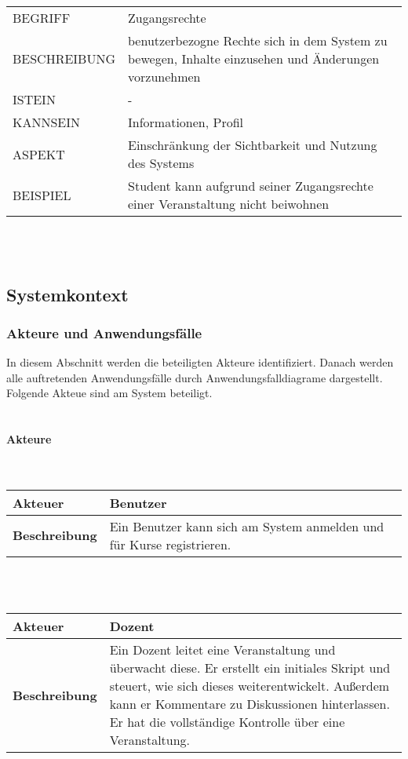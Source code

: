 \documentclass[12pt,a4paper]{article}
\begin{document}
\begin{tabular}{l p{10cm}}
BEGRIFF 	 & Zugangsrechte \\ 
BESCHREIBUNG & benutzerbezogne Rechte sich in dem System zu bewegen, Inhalte einzusehen und Änderungen vorzunehmen \\ 
ISTEIN   	 & - \\
KANNSEIN 	 & Informationen, Profil\\ 
ASPEKT   	 & Einschränkung der Sichtbarkeit und Nutzung des Systems \\
BEISPIEL 	 & Student kann aufgrund seiner Zugangsrechte einer Veranstaltung 				   nicht beiwohnen\\
\hline
\end{tabular}\\\\ 


\subsection{Systemkontext}
\subsubsection{Akteure und Anwendungsfälle}
In diesem Abschnitt werden die beteiligten Akteure identifiziert. Danach werden alle auftretenden Anwendungsfälle durch Anwendungsfalldiagrame dargestellt.
Folgende Akteue sind am System beteiligt.\\\\
\paragraph{Akteure}
\mbox{}\\
\begin{tabular}{l p{10cm}}
\textbf{Akteuer} & Benutzer \\ 
\hline \textbf{Beschreibung} & Ein Benutzer kann sich am System anmelden und für Kurse registrieren. \\ 
\hline 
\end{tabular}\\\\

\begin{tabular}{l p{10cm}}
\textbf{Akteuer} & Dozent \\ 
\hline \textbf{Beschreibung} & Ein Dozent leitet eine Veranstaltung und überwacht diese. Er erstellt ein initiales Skript und steuert, wie sich dieses weiterentwickelt. Außerdem kann er Kommentare zu Diskussionen hinterlassen. Er hat die vollständige Kontrolle über eine Veranstaltung.\\ 
\hline 
\end{tabular}\\\\
\end{document}

